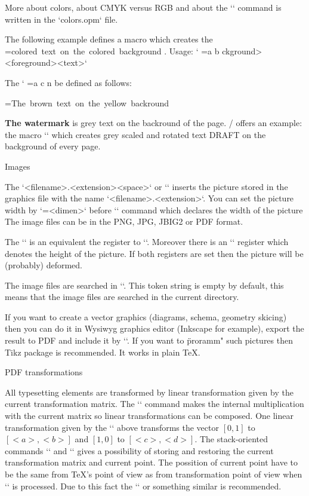 {More about colors, about CMYK versus RGB and
about the `` command is written in the `colors.opm` file.

\def\coloron#1#2#3{%
   \setbox0=\hbox{#3}\leavevmode
   {\localcolor\rlap{#1\strut \vrule width\wd0}#2}%
}
The following example defines a macro which creates the
\coloron\Yellow\Brown{colored text on the colored background}. Usage:
`\coloron<background><foreground>{<text>}`

The `\coloron` can be defined as follows:

\begtt
\def\coloron#1#2#3{%
   \setbox0=\hbox{#3}\leavevmode
   {\rlap{#1\strut \vrule width\wd0}#2}%
}
\coloron\Yellow\Brown{The brown text on the yellow backround}
\endtt

{\bf The watermark} is grey text on the backround of the page. \OpTeX/ offers
an example: the macro `\draft` which creates grey scaled and rotated text
DRAFT on the background of every page.

\secc Images

The `\inspic <filename>.<extension><space>` or
``
inserts the picture stored in
the graphics file  with the name `<filename>.<extension>`. 
You can set the picture width by `\picw=<dimen>`
before `\inspic` command which declares the width of the picture 
The image files can be in the PNG, JPG, JBIG2 or PDF format. 

The `\picwidth` is an equivalent the register to `\picw`. Moreover there is an
`\picheight` register which denotes the height of the picture. If both
registers are set then the picture will be (probably) deformed. 

The image files are searched in `\picdir`. This token string is empty 
by default, this means that the image files are searched in the 
current directory.

If you want to create a vector graphics (diagrams, schema, geometry
skicing) then you can do it in Wysiwyg graphics editor (Inkscape for
example), export the result to PDF and include it by `\inspic`.
If you want to \"proramm" such pictures then Tikz package is recommended.
It works in plain \TeX. 

\secc PDF transformations

All typesetting elements are transformed by linear
transformation given by the current transformation matrix. The
`` command makes the internal multiplication
with the current matrix so linear transformations can be composed. 
One linear transformation given by the `\pdfsetmatrix` above transforms
the vector $[0,1]$ to $[<a>,<b>]$ and $[1,0]$ to $[<c>,<d>]$.
The stack-oriented commands `\pdfsave` and `\pdfrestore` gives a possibility of
storing and restoring the current transformation matrix and current point.
The possition of current point have to be the same from \TeX{}'s point of
view as from transformation point of view when `\pdfrestore` is processed.
Due to this fact the `\pdfsave{}\pdfrestore` 
or something similar is recommended.

}
